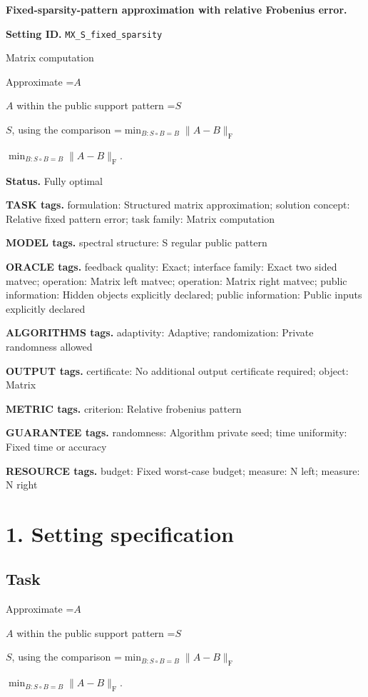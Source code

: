 \documentclass[10pt,a4paper]{article}
\newcommand{\AtlasMath}[1]{\par\begingroup\centering\setbox0=\hbox{$\displaystyle #1$}\ifdim\wd0>1.4\linewidth\typeout{ATLAS WIDE FORMULA: \the\wd0}\fi\ifdim\wd0>\linewidth\resizebox{\linewidth}{!}{\box0}\else\box0\fi\par\endgroup}
\newcommand{\AtlasInlineMath}[1]{\begingroup\setbox0=\hbox{$#1$}\ifdim\wd0>.4\linewidth\endgroup\AtlasMath{#1}\else\endgroup$#1$\fi}
\begin{document}
\raggedright

{\LARGE\bfseries\sffamily\color{AtlasNavy} Fixed-sparsity-pattern approximation with relative Frobenius error.\par}\vspace{5pt}
\textbf{Setting ID.} \texttt{MX\_\allowbreak{}S\_\allowbreak{}fixed\_\allowbreak{}sparsity}

Matrix computation

Approximate \AtlasInlineMath{A} within the public support pattern \AtlasInlineMath{S}, using the comparison \AtlasInlineMath{\min_{B:S\circ B=B}\|A-B\|_{\mathrm{F}}}.

\textbf{Status.} Fully optimal

\textbf{TASK tags.} formulation: Structured matrix approximation; solution concept: Relative fixed pattern error; task family: Matrix computation

\textbf{MODEL tags.} spectral structure: S regular public pattern

\textbf{ORACLE tags.} feedback quality: Exact; interface family: Exact two sided matvec; operation: Matrix left matvec; operation: Matrix right matvec; public information: Hidden objects explicitly declared; public information: Public inputs explicitly declared

\textbf{ALGORITHMS tags.} adaptivity: Adaptive; randomization: Private randomness allowed

\textbf{OUTPUT tags.} certificate: No additional output certificate required; object: Matrix

\textbf{METRIC tags.} criterion: Relative frobenius pattern

\textbf{GUARANTEE tags.} randomness: Algorithm private seed; time uniformity: Fixed time or accuracy

\textbf{RESOURCE tags.} budget: Fixed worst-case budget; measure: N left; measure: N right

\section{1. Setting specification}
\subsection{Task}
Approximate \AtlasInlineMath{A} within the public support pattern \AtlasInlineMath{S}, using the comparison \AtlasInlineMath{\min_{B:S\circ B=B}\|A-B\|_{\mathrm{F}}}.
\end{document}
